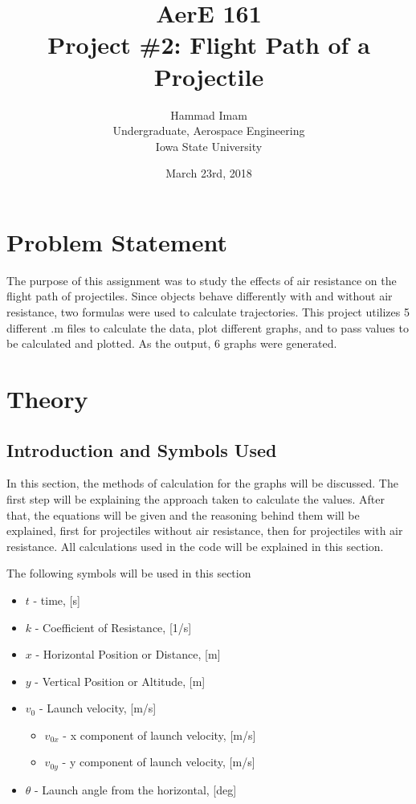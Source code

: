 \documentclass[oneside]{article}
\title{AerE 161 \\ Project \#2: Flight Path of a Projectile}
\author{Hammad Imam \\ Undergraduate, Aerospace Engineering \\ Iowa State University}
\date{March 23rd,	2018}
\begin{document}
\begin{titlepage}
\maketitle
\end{titlepage}

\clearpage
\tableofcontents

\newpage

\section{Problem Statement}
The purpose of this assignment was to study the effects of air resistance on the flight path of projectiles. Since objects behave differently with and without air resistance, two formulas were used to calculate trajectories. This project utilizes 5 different .m files to calculate the data, plot different graphs, and to pass values to be calculated and plotted. As the output, 6 graphs were generated.

\newpage
\section{Theory}
\subsection{Introduction and Symbols Used}
In this section, the methods of calculation for the graphs will be discussed. The first step will be explaining the approach taken to calculate the values. After that, the equations will be given and the reasoning behind them will be explained, first for projectiles without air resistance, then for projectiles with air resistance. All calculations used in the code will be explained in this section.

The following symbols will be used in this section
\begin{itemize}
    \item $t$ - time, [s]
    \item $k$ - Coefficient of Resistance, [1/s]
    \item $x$ - Horizontal Position or Distance, [m]
    \item $y$ - Vertical Position or Altitude, [m]
    \item $v_0$ - Launch velocity, [m/s]
    \begin{itemize}
        \item $v_{0x}$ - x component of launch velocity, [m/s]
        \item $v_{0y}$ - y component of launch velocity, [m/s]
    \end{itemize}
    \item $\theta$ - Launch angle from the horizontal, [deg]
\end{itemize}
\end{document}

